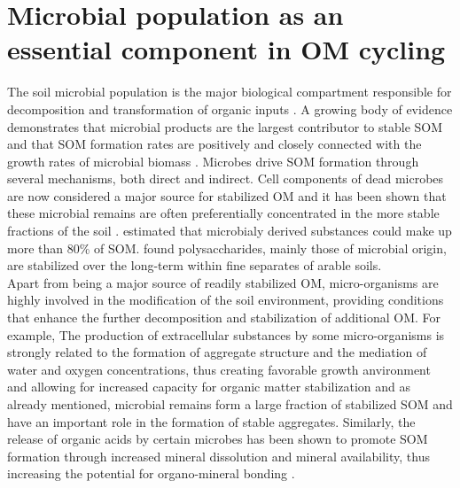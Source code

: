 \documentclass[12pt]{report}
\begin{document}
	  
	 
\section{Microbial population as an essential component in OM cycling}
  	
  	The soil microbial population is the major biological compartment responsible for decomposition and transformation of organic inputs \citep{thiet2006}. A growing body of evidence demonstrates that microbial products are the largest contributor to stable SOM and that SOM formation rates are positively and closely connected with the growth rates of microbial biomass \citep{kallenbach2016, kallenbach2015, ludwig2015, schurig2013, bradford2013}. Microbes drive SOM formation through several mechanisms, both direct and indirect. Cell components of dead microbes are now considered a major source for stabilized OM \citep{kallenbach2015, liang2011, miltner2009} and it has been shown that these microbial remains are often preferentially concentrated in the more stable fractions of the soil \citep{ludwig2015}. \citet{liang2011} estimated that microbialy derived substances could make up more than 80\% of SOM⁠. 
  	\citet{kiem2003} found polysaccharides, mainly those of microbial origin, are stabilized over the long-term within fine separates of arable soils.\\
  	Apart from being a major source of readily stabilized OM, micro-organisms are highly involved in the  modification of the soil environment, providing conditions that enhance the further decomposition and stabilization of additional OM.  For example, The production of extracellular substances by some micro-organisms is strongly related to the formation of aggregate structure and the mediation of water and oxygen concentrations, thus creating favorable growth anvironment and allowing for increased capacity for organic matter stabilization \citep{schimel2012} ⁠and as already mentioned, microbial remains form a large fraction of stabilized SOM and have an important role in the formation of stable aggregates. Similarly, the release of organic acids by certain microbes has been shown to promote SOM formation through increased mineral dissolution and mineral availability, thus increasing the potential for organo-mineral bonding \citep{yu2018}.
  	
 	
  	
\end{document}

